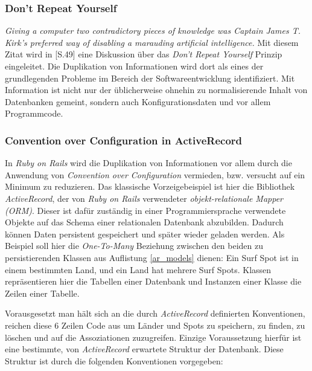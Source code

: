 \subsubsection{Don't Repeat Yourself}

\textit{Giving a computer two contradictory pieces of knowledge was
  Captain James T. Kirk's preferred way of disabling a marauding
  artificial intelligence.} Mit diesem Zitat wird in
\cite{Hunt99}[S.49] eine Diskussion über das \textit{Don't Repeat
  Yourself} Prinzip eingeleitet. Die Duplikation von Informationen
wird dort als eines der grundlegenden Probleme im Bereich der
Softwareentwicklung identifiziert. Mit Information ist nicht nur der
üblicherweise ohnehin zu normalisierende Inhalt von Datenbanken
gemeint, sondern auch Konfigurationsdaten und vor allem Programmcode.

\subsubsection{Convention over Configuration in ActiveRecord}
In \textit{Ruby on Rails} wird die Duplikation von Informationen vor
allem durch die Anwendung von \textit{Convention over Configuration}
vermieden, bzw. versucht auf ein Minimum zu reduzieren. Das klassische
Vorzeigebeispiel ist hier die Bibliothek \textit{ActiveRecord}, der
von \textit{Ruby on Rails} verwendeter \textit{objekt-relationale
  Mapper (ORM)}. Dieser ist dafür zuständig in einer
Programmiersprache verwendete Objekte auf das Schema einer
relationalen Datenbank abzubilden. Dadurch können Daten persistent
gespeichert und später wieder geladen werden. Als Beispiel soll hier
die \textit{One-To-Many} Beziehung zwischen den beiden zu
persistierenden Klassen aus Auflistung \ref{ar_models} dienen: Ein
Surf Spot ist in einem bestimmten Land, und ein Land hat mehrere Surf
Spots. Klassen repräsentieren hier die Tabellen einer Datenbank und
Instanzen einer Klasse die Zeilen einer Tabelle.



Vorausgesetzt man hält sich an die durch \textit{ActiveRecord}
definierten Konventionen, reichen diese 6 Zeilen Code aus um Länder
und Spots zu speichern, zu finden, zu löschen und auf die
Assoziationen zuzugreifen. Einzige Voraussetzung hierfür ist eine
bestimmte, von \textit{ActiveRecord} erwartete Struktur der
Datenbank. Diese Struktur ist durch die folgenden Konventionen
vorgegeben:

